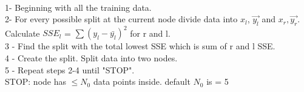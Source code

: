\documentclass[12pt]{article}
\begin{document}
\begin{enumerate}
\\
1- Beginning with all the training data.\\
2- For every possible split at the current node divide data into $x_l$, $\vec{y_l}$ and $x_r, \vec{y_r} $. Calculate $SSE_l$ = $\sum (y_l - \bar{y_l})^2$ for r and l.\\
3 - Find the split with the total lowest SSE which is sum of r and l SSE.\\
4 - Create the split. Split data into two nodes.\\
5 - Repeat steps 2-4 until "STOP".\\
STOP: node has $\leq N_0 $ data points inside. default $N_0$ is = 5
\\
~


\end{enumerate}
\end{document}
